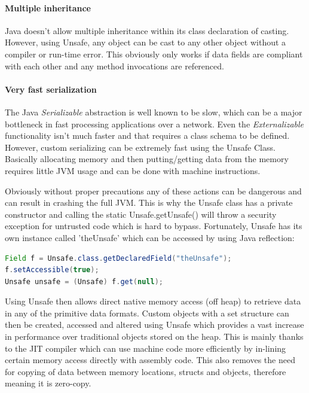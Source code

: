 \documentclass[final_report.tex]{subfiles}
\begin{document}
\paragraph*{Multiple inheritance}
Java doesn't allow multiple inheritance within its class declaration of casting. However, using Unsafe, any object can be cast to any other object without a compiler or run-time error. This obviously only works if data fields are compliant with each other and any method invocations are referenced. 

\paragraph*{Very fast serialization}
The Java \textit{Serializable} abstraction is well known to be slow, which can be a major bottleneck in fast processing applications over a network. Even the \textit{Externalizable} functionality isn't much faster and that requires a class schema to be defined. However, custom serializing can be extremely fast using the Unsafe Class. Basically allocating memory and then putting/getting data from the memory requires little JVM usage and can be done with machine instructions.

Obviously without proper precautions any of these actions can be dangerous and can result in crashing the full JVM. This is why the Unsafe class has a private constructor and calling the static Unsafe.getUnsafe() will throw a security exception for untrusted code which is hard to bypass. Fortunately, Unsafe has its own instance called 'theUnsafe' which can be accessed by using Java reflection:

\begin{lstlisting}[language=Java, caption={Accessing Java Unsafe}, label=lst:java_unsafe]
Field f = Unsafe.class.getDeclaredField("theUnsafe");
f.setAccessible(true);
Unsafe unsafe = (Unsafe) f.get(null);
\end{lstlisting}

Using Unsafe then allows direct native memory access (off heap) to retrieve data in any of the primitive data formats. Custom objects with a set structure can then be created, accessed and altered using Unsafe which provides a vast increase in performance over traditional objects stored on the heap. This is mainly thanks to the JIT compiler which can use machine code more efficiently by in-lining certain memory access directly with assembly code. This also removes the need for copying of data between memory locations, structs and objects, therefore meaning it is zero-copy.
\end{document}
